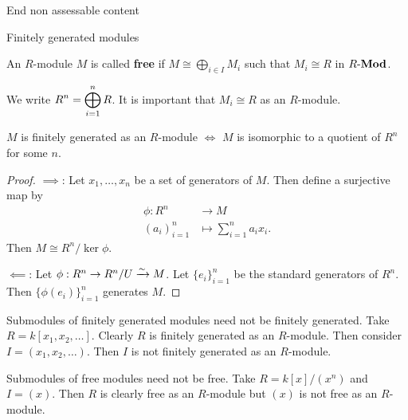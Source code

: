 End non assessable content

Finitely generated modules

\begin{defn}[1.17]
	An $R$-module $M$ is called \textbf{free} if $M \cong \bigoplus_{i \in I} M_i$ such that $M_i \cong R$ in $R\mbox{-}\mathbf{Mod}$.
\end{defn}

\begin{rmk}
	\leavevmode
	\begin{enum}
		\io We write $\displaystyle R^n = \bigoplus_{i=1}^n R$.
		\io It is important that $M_i \cong R$ as an $R$-module.
	\end{enum}
\end{rmk}

\begin{prop}[1.18]
	$M$ is finitely generated as an $R$-module $\iff$ $M$ is isomorphic to a quotient of $R^n$ for some $n$.
\end{prop}

\begin{proof}
	$\implies$: Let $x_1,\ldots,x_n$ be a set of generators of $M$.
	Then define a surjective map by
	\begin{align*}
		\phi: R^n &\to M \\
		(a_i)_{i=1}^n &\mapsto \sum_{i=1}^n a_ix_i.
	\end{align*}
	Then $M \cong R^n/\ker\phi$.
	
	$\impliedby$: Let $\phi: R^n \to R^n/U \xrightarrow{\sim} M$.
	Let $\{e_i\}_{i=1}^n$ be the standard generators of $R^n$.
	Then $\{\phi(e_i)\}_{i=1}^n$ generates $M$.
\end{proof}

\begin{rmk}
	Submodules of finitely generated modules need not be finitely generated.
	Take $R=k[x_1,x_2,\ldots]$.
	Clearly $R$ is finitely generated as an $R$-module.
	Then consider $I = (x_1,x_2,\ldots)$.
	Then $I$ is not finitely generated as an $R$-module.
	
	Submodules of free modules need not be free.
	Take $R = k[x]/(x^n)$ and $I=(x)$.
	Then $R$ is clearly free as an $R$-module but $(x)$ is not free as an $R$-module.
\end{rmk}

